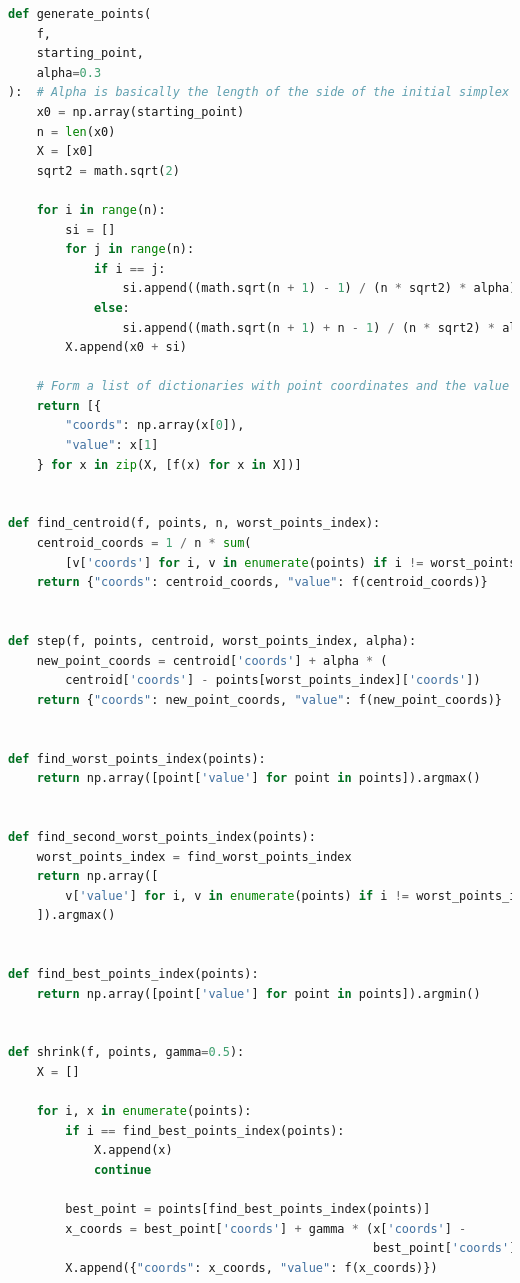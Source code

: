 \documentclass{VUMIFPSkursinis}
\begin{document}
\begin{lstlisting}[language=Python,caption={Deformuojamo simplekso algoritmo realizacija su Python},label={code:nm}]
  def generate_points(
    f,
    starting_point,
    alpha=0.3
):  # Alpha is basically the length of the side of the initial simplex
    x0 = np.array(starting_point)
    n = len(x0)
    X = [x0]
    sqrt2 = math.sqrt(2)

    for i in range(n):
        si = []
        for j in range(n):
            if i == j:
                si.append((math.sqrt(n + 1) - 1) / (n * sqrt2) * alpha)
            else:
                si.append((math.sqrt(n + 1) + n - 1) / (n * sqrt2) * alpha)
        X.append(x0 + si)

    # Form a list of dictionaries with point coordinates and the value of a function
    return [{
        "coords": np.array(x[0]),
        "value": x[1]
    } for x in zip(X, [f(x) for x in X])]


def find_centroid(f, points, n, worst_points_index):
    centroid_coords = 1 / n * sum(
        [v['coords'] for i, v in enumerate(points) if i != worst_points_index])
    return {"coords": centroid_coords, "value": f(centroid_coords)}


def step(f, points, centroid, worst_points_index, alpha):
    new_point_coords = centroid['coords'] + alpha * (
        centroid['coords'] - points[worst_points_index]['coords'])
    return {"coords": new_point_coords, "value": f(new_point_coords)}


def find_worst_points_index(points):
    return np.array([point['value'] for point in points]).argmax()


def find_second_worst_points_index(points):
    worst_points_index = find_worst_points_index
    return np.array([
        v['value'] for i, v in enumerate(points) if i != worst_points_index
    ]).argmax()


def find_best_points_index(points):
    return np.array([point['value'] for point in points]).argmin()


def shrink(f, points, gamma=0.5):
    X = []

    for i, x in enumerate(points):
        if i == find_best_points_index(points):
            X.append(x)
            continue

        best_point = points[find_best_points_index(points)]
        x_coords = best_point['coords'] + gamma * (x['coords'] -
                                                   best_point['coords'])
        X.append({"coords": x_coords, "value": f(x_coords)})


\end{lstlisting}
\end{document}
